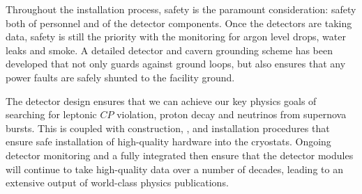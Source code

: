 Throughout the installation process, safety is the paramount consideration: safety both of personnel and of the detector components. Once the detectors are taking data, safety is still the priority with the  monitoring for argon level drops, water leaks and smoke. A detailed detector and cavern grounding scheme has been developed that not only guards against ground loops, but also ensures that any power faults are safely shunted to the facility ground.

The detector design ensures that we can achieve our key physics goals of searching for leptonic $CP$ violation, proton decay and neutrinos from supernova bursts. This is coupled with construction, ,  and installation procedures that ensure safe installation of high-quality hardware into the cryostats. Ongoing detector monitoring and a fully integrated  then ensure that the detector modules will continue to take high-quality data over a number of decades, leading to an extensive output of world-class physics publications.

